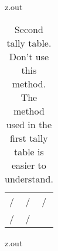 \begin{VerbatimOut}{z.out}
\begin{table}[ht]
  \caption{%
    Second tally table.
    Don't use this method.
    The method used in the first tally table
    is easier to understand.%
  }%
  \vspace*{6pt}
  \begin{tabularx}{\textwidth}{@{\kern\tlen}XXl@{\kern\tlen}}%
    \g 01/& \g 02/& \g 03/\\
    \g 04/& \g 05/\\
  \end{tabularx}%
\end{table}
\end{VerbatimOut}

\MyIO



\MyIO
  

\begin{VerbatimOut}{z.out}


\FloatBarrier
\end{VerbatimOut}

\MyIO





